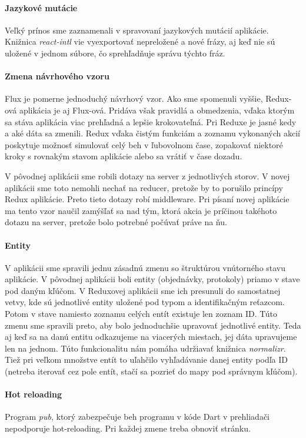 \paragraph{Jazykové mutácie}
Veľký prínos sme zaznamenali v spravovaní jazykových mutácií aplikácie. Knižnica \emph{react-intl} vie vyexportovať nepreložené a nové frázy, aj keď nie sú uložené v jednom súbore, čo sprehľadňuje správu týchto fráz.

\paragraph{Zmena návrhového vzoru}
\NEW{}
Flux je pomerne jednoduchý návrhový vzor. Ako sme spomenuli vyššie, Redux-ová aplikácia je aj Flux-ová. Pridáva však pravidlá a obmedzenia, vďaka ktorým sa stáva aplikácia viac prehľadná a lepšie krokovateľná. Pri Reduxe je jasné kedy a aké dáta sa zmenili. Redux vďaka čistým funkciám a zoznamu vykonaných akcií poskytuje možnosť simulovať celý beh v ľubovolnom čase, zopakovať niektoré kroky s rovnakým stavom aplikácie alebo sa vrátiť v čase dozadu.

V pôvodnej aplikácii sme robili dotazy na server z jednotlivých storov. V novej aplikácii sme toto nemohli nechať na reducer, pretože by to porušilo princípy Redux aplikácie. Preto tieto dotazy robí middleware. Pri písaní novej aplikácie ma tento vzor naučil zamýšľať sa nad tým, ktorá akcia je príčinou takéhoto dotazu na server, pretože bolo potrebné počúvať práve na ňu.

\paragraph{Entity}%
V aplikácii sme spravili jednu zásadnú zmenu so štruktúrou vnútorného stavu aplikácie. V pôvodnej aplikácii boli entity (objednávky, protokoly) priamo v stave pod daným kľúčom. 
V Reduxovej aplikácii sme ich presunuli do samostatnej vetvy, kde sú jednotlivé entity uložené pod typom a identifikačným reťazcom. Potom v stave namiesto zoznamu celých entít existuje len zoznam ID. 
Túto zmenu sme spravili preto, aby bolo jednoduchšie upravovať jednotlivé entity. Teda aj keď sa na danú entitu odkazujeme na viacerých miestach, jej dáta upravujeme len na jednom. Túto funkcionalitu nám pomáha udržiavať knižnica \emph{normalizr}.
Tiež pri veľkom množstve entít to uľahčilo vyhľadávanie danej entity podľa ID (netreba iterovať cez pole entít, stačí sa pozrieť do mapy pod správnym kľúčom).

\paragraph{Hot reloading}%
\NEW{}
Program \emph{pub}, ktorý zabezpečuje beh programu v kóde Dart v prehliadači nepodporuje hot-reloading. Pri každej zmene treba obnoviť stránku.

